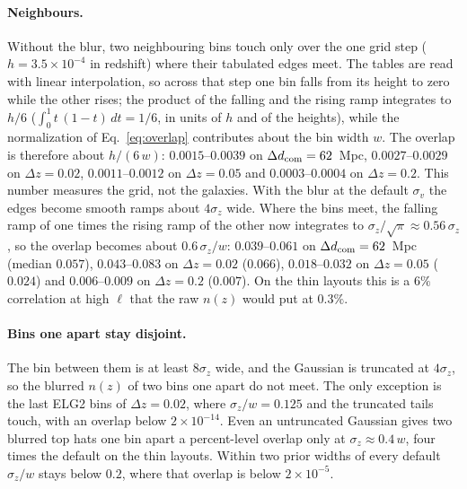 \documentclass[11pt]{article}
\newcommand{\dcom}{$\Delta d_{\rm com} = 62$~Mpc}
\newcommand{\sv}{\sigma_v}
\begin{document}
\paragraph{Neighbours.}
Without the blur, two neighbouring bins touch only over the one grid
step ($h = 3.5 \times 10^{-4}$ in redshift) where their tabulated
edges meet.  The tables are read with linear interpolation, so across
that step one bin falls from its height to zero while the other
rises; the product of the falling and the rising ramp integrates to
$h/6$ ($\int_0^1 t\,(1 - t)\,dt = 1/6$, in units of $h$ and of the
heights), while the normalization of Eq.~\eqref{eq:overlap}
contributes about the bin width $w$.  The overlap is therefore about
$h/(6\,w)$: $0.0015$--$0.0039$ on \dcom{}, $0.0027$--$0.0029$ on
$\Delta z = 0.02$, $0.0011$--$0.0012$ on $\Delta z = 0.05$ and
$0.0003$--$0.0004$ on $\Delta z = 0.2$.  This number measures the grid,
not the galaxies.  With the blur at the default $\sv$ the edges become
smooth ramps about $4\sigma_z$ wide.  Where the bins meet, the
falling ramp of one times the rising ramp of the other now integrates
to $\sigma_z/\sqrt{\pi} \approx 0.56\,\sigma_z$, so the overlap
becomes about
$0.6\,\sigma_z/w$: $0.039$--$0.061$ on \dcom{} (median $0.057$),
$0.043$--$0.083$ on $\Delta z = 0.02$ ($0.066$), $0.018$--$0.032$ on
$\Delta z = 0.05$ ($0.024$) and $0.006$--$0.009$ on $\Delta z = 0.2$
($0.007$).  On the thin layouts this is a $6\%$ correlation at high
$\ell$ that the raw $n(z)$ would put at $0.3\%$.

\paragraph{Bins one apart stay disjoint.}
The bin between them is at least $8\sigma_z$ wide, and the Gaussian is
truncated at $4\sigma_z$, so the blurred $n(z)$ of two bins one apart
do not meet.  The only exception is the last ELG2 bins of
$\Delta z = 0.02$, where $\sigma_z/w = 0.125$ and the truncated tails
touch, with an overlap below $2 \times 10^{-14}$.  Even an untruncated
Gaussian gives two blurred top hats one bin apart a percent-level
overlap only at $\sigma_z \approx 0.4\,w$, four times the default on the
thin layouts.  Within two prior widths of every default $\sigma_z/w$
stays below $0.2$, where that overlap is below $2 \times 10^{-5}$.
\end{document}

